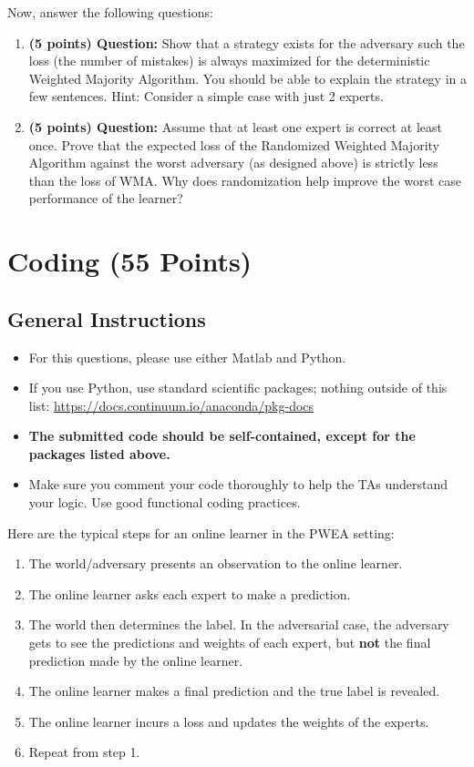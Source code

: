 \documentclass{article}
\begin{document}
\noindent Now, answer the following questions:

\begin{enumerate}
    \item \textbf{(5 points) Question:} Show that a strategy exists for the adversary such the loss (the number of mistakes) is always maximized for the deterministic Weighted Majority Algorithm. You should be able to explain the strategy in a few sentences. Hint: Consider a simple case with just 2 experts.
    
    \item \textbf{(5 points) Question:} Assume that at least one expert is correct at least once. Prove that the expected loss of the Randomized Weighted Majority Algorithm against the worst adversary (as designed above) is strictly less than the loss of WMA. Why does randomization help improve the worst case performance of the learner?
    
\end{enumerate}

\section{Coding (55 Points)}
\subsection{General Instructions}
\begin{itemize}
    \item For this questions, please use either Matlab and Python. 
    \item If you use Python, use standard scientific packages; nothing outside of this list: \href{https://docs.continuum.io/anaconda/pkg-docs}{https://docs.continuum.io/anaconda/pkg-docs}
    \item \textbf{The submitted code should be self-contained, except for the packages listed above.}
    \item Make sure you comment your code thoroughly to help the TAs understand your logic. Use good functional coding practices.
\end{itemize}

\noindent Here are the typical steps for an online learner in the PWEA setting:
\begin{enumerate}
    \item The world/adversary presents an observation to the online learner.
    \item The online learner asks each expert to make a prediction.
    \item The world then determines the label. In the adversarial case, the adversary gets to see the predictions and weights of each expert, but \textbf{not} the final prediction made by the online learner.
    \item The online learner makes a final prediction and the true label is revealed.
    \item The online learner incurs a loss and updates the weights of the experts.
    \item Repeat from step 1.
\end{enumerate}
\end{document}

